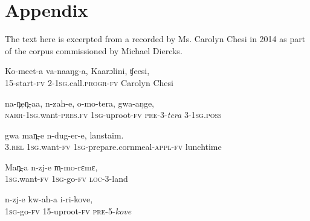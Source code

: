 \documentclass[output=paper]{LSP/langsci}
\begin{document}
\section*{Appendix}
\setcounter{equation}{0}
The text here is excerpted from a  recorded by Ms. Carolyn Chesi in 2014 as part of the  corpus commissioned by Michael Diercks.


 \begin{exe}
 \label{Saapp1}
\gll Ko-meet-a va-naaŋg-a, Kaarɔlini, ʧeesi,\\     	       
\textsc{15}-start-\textsc{fv}  \textsc{2}-\textsc{1sg}.call.\textsc{progr}-\textsc{fv}  Carolyn  Chesi \\
\glt {} 
\end{exe}

 \begin{exe}
 \label{Saapp2}
\gll na-n̪en̪-aa, n-zah-e, o-mo-tera, gwa-aŋge,\\
\textsc{narr}-\textsc{1sg}.want-\textsc{pres}.\textsc{fv}  \textsc{1sg}-uproot-\textsc{fv}  \textsc{pre}-\textsc{3}-\textit{tera}  \textsc{3}-\textsc{1sg}.\textsc{poss}\\
\glt {}
\end{exe}

 \begin{exe}
 \label{Saapp3}
\gll gwa man̪-e n-dug-er-e, lanstaim.\\
\textsc{3}.\textsc{rel}  \textsc{1sg}.want-\textsc{fv}  \textsc{1sg}-prepare.cornmeal-\textsc{appl}-\textsc{fv}  lunchtime\\
\glt {}
\end{exe}

 \begin{exe}
 \label{Saapp4}
\gll Man̪-a n-zj-e m̩-mo-rɛmɛ,\\
\textsc{1sg}.want-\textsc{fv}   \textsc{1sg}-go-\textsc{fv}   \textsc{loc}-\textsc{3}-land\\
\glt {}
\end{exe}

 \begin{exe}
 \label{Saapp5}
\gll n-zj-e kw-ah-a i-ri-kove,\\
\textsc{1sg}-go-\textsc{fv}   \textsc{15}-uproot-\textsc{fv}   \textsc{pre}-\textsc{5}-\textit{kove}\\
\glt {}
\end{exe}
\end{document}
